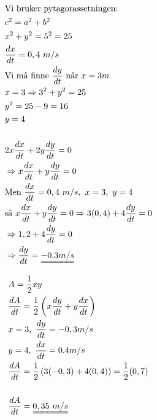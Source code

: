 
\newpage
{}
\oppgaveDelStart
{}
\begin{align*}
&\text{Vi bruker pytagorassetningen:}\\
&c^2 = a^2 + b^2\\
&x^2 + y^2 = 5^2 = 25\\
&\frac{dx}{dt} = 0,4\ m/s\\
&\text{Vi må finne $\frac{dy}{dt}$ når $x = 3m$}\\
&x = 3 \Rightarrow 3^2 + y^2 = 25\\
&y^2 = 25-9 = 16\\
&y = 4\\\\
&2x \frac{dx}{dt} + 2y \frac{dy}{dt} = 0\\
&\Rightarrow x \frac{dx}{dt} + y \frac{dy}{dt} = 0\\
&\text{Men }\frac{dx}{dt} = 0,4\ m/s, \ x = 3, \ y =4\\
&\text{så } x \frac{dx}{dt} + y \frac{dy}{dt} = 0 \Rightarrow 3(0,4) + 4 \frac{dy}{dt} = 0\\
&\Rightarrow 1,2 + 4 \frac{dy}{dt} = 0\\
&\Rightarrow \frac{dy}{dt} = \uuline{-0.3 m/s}
\end{align*}

\begin{align*}
&A = \frac{1}{2} x y\\
&\frac{dA}{dt} = \frac{1}{2} \left( x \frac{dy}{dt} + y \frac{dx}{dt} \right)\\
&x = 3, \ \frac{dy}{dt} = -0,3m/s\\
&y = 4, \ \frac{dx}{dt} = 0.4 m/s\\
&\frac{dA}{dt} = \frac{1}{2} \left( 3 (-0,3) + 4 (0,4) \right) = \frac{1}{2}(0,7)\\\\
&\frac{dA}{dt} = \uuline{0,35 \ m/s}
\end{align*}
\oppgaveDelSlutt

